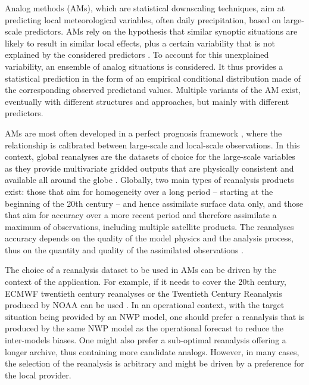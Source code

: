 \documentclass[alpha-refs]{wiley-article}
\begin{document}
Analog methods (AMs), which are statistical downscaling techniques, aim at predicting local meteorological variables, often daily precipitation, based on large-scale predictors. AMs rely on the hypothesis that similar synoptic situations are likely to result in similar local effects, plus a certain variability that is not explained by the considered predictors \citep{Lorenz1969}. To account for this unexplained variability, an ensemble of analog situations is considered. It thus provides a statistical prediction in the form of an empirical conditional distribution made of the corresponding observed predictand values. Multiple variants of the AM exist, eventually with different structures and approaches, but mainly with different predictors.

AMs are most often developed in a perfect prognosis framework \citep{Rummukainen1997, Maraun2010}, where the relationship is calibrated between large-scale and local-scale observations. In this context, global reanalyses are the datasets of choice for the large-scale variables as they provide multivariate gridded outputs that are physically consistent and available all around the globe \citep{Gelaro2017}. Globally, two main types of reanalysis products exist: those that aim for homogeneity over a long period -- starting at the beginning of the 20th century -- and hence assimilate surface data only, and those that aim for accuracy over a more recent period and therefore assimilate a maximum of observations, including multiple satellite products. The reanalyses accuracy depends on the quality of the model physics and the analysis process, thus on the quantity and quality of the assimilated observations \citep{Dee2011a}.

The choice of a reanalysis dataset to be used in AMs can be driven by the context of the application. For example, if it needs to cover the 20th century, ECMWF twentieth century reanalyses \citep[ERA-20C or CERA-20C --][]{Poli2016, Laloyaux2016} or the Twentieth Century Reanalysis \citep[20CR --][]{Compo2011} produced by NOAA can be used \citep[for example,][]{Kuentz2015, Caillouet2016, Brigode2016, Bonnet2017}. In an operational context, with the target situation being provided by an NWP model, one should prefer a reanalysis that is produced by the same NWP model as the operational forecast to reduce the inter-models biases. One might also prefer a sub-optimal reanalysis offering a longer archive, thus containing more candidate analogs. However, in many cases, the selection of the reanalysis is arbitrary and might be driven by a preference for the local provider.  
\end{document}
